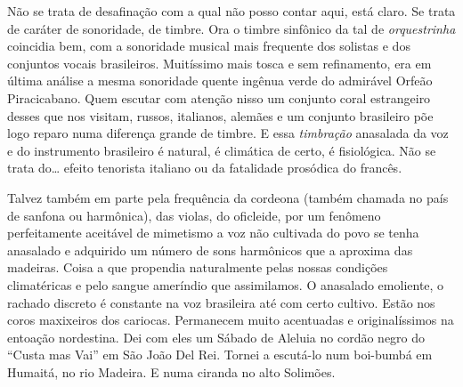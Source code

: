 Não se trata de desafinação com a qual não posso contar aqui, está
claro. Se trata de caráter de sonoridade, de timbre. Ora o timbre
sinfônico da tal de \textit{orquestrinha} coincidia bem, com a sonoridade musical
mais frequente dos solistas e dos conjuntos vocais brasileiros.
Muitíssimo mais tosca e sem refinamento, era em última análise a mesma
sonoridade quente ingênua verde do admirável Orfeão Piracicabano. Quem
escutar com atenção nisso um conjunto coral estrangeiro desses que nos
visitam, russos, italianos, alemães e um conjunto brasileiro põe logo
reparo numa diferença grande de timbre. E essa \textit{timbração} anasalada da
voz e do instrumento brasileiro é natural, é climática de certo, é
fisiológica. Não se trata do\ldots{} efeito tenorista italiano ou da
fatalidade prosódica do francês.

Talvez também em parte pela frequência da cordeona (também chamada no
país de sanfona ou harmônica), das violas, do oficleide, por um fenômeno
perfeitamente aceitável de mimetismo a voz não cultivada do povo se
tenha anasalado e adquirido um número de sons harmônicos que a aproxima
das madeiras. Coisa a que propendia naturalmente pelas nossas condições
climatéricas e pelo sangue ameríndio que assimilamos. O anasalado
emoliente, o rachado discreto é constante na voz brasileira até com
certo cultivo. Estão nos coros maxixeiros dos cariocas. Permanecem muito
acentuadas e originalíssimos na entoação nordestina. Dei com eles um
Sábado de Aleluia no cordão negro do ``Custa mas Vai'' em São João Del Rei.
Tornei a escutá-lo num boi-bumbá em Humaitá, no rio Madeira. E numa
ciranda no alto Solimões.


